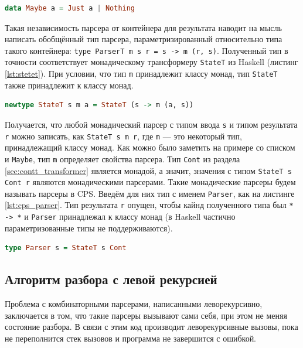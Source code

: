 \documentclass[times]{itmo-student-thesis}
\begin{document}
\begin{lstlisting}[language=Haskell,float=!h,caption={Тип Maybe в Haskell},label={lst:maybe}]
  data Maybe a = Just a | Nothing
\end{lstlisting}

Такая независимость парсера от контейнера для результата наводит на мысль написать обобщённый тип парсера,
параметризированный относительно типа такого контейнера: \lstinline {type ParserT m s r = s -> m (r, s)}. Полученный
тип в точности соответствует монадическому трансформеру \lstinline{StateT} из Haskell (листинг \ref{lst:stetet}). При условии, что	тип
\lstinline{m} принадлежит классу монад, тип \lstinline{StateT} также принадлежит к классу монад. 

\begin{lstlisting}[language=Haskell,float=!h,caption={StateT трансформер монад},label={lst:stetet}]
  newtype StateT s m a = StateT (s -> m (a, s))
\end{lstlisting}

Получается, что любой монадический парсер с типом ввода \lstinline{s} и типом результата \lstinline{r} можно
записать, как \lstinline{StateT s m r}, где \lstinline{m} --- это некоторый тип, принадлежащий классу монад. Как можно 
было заметить на примере со списком и \lstinline{Maybe}, тип \lstinline{m} определяет свойства парсера. 
Тип \lstinline{Cont} из раздела \ref{sec:contt_transformer} является монадой, а значит, значения с типом
\lstinline{StateT s Cont r} являются монадическими парсерами. Такие монадические парсеры будем называть парсеры
в CPS. Введём для них тип с именем \lstinline{Parser}, как на листинге \ref{lst:cps_parser}. Тип результата
\lstinline{r} опущен, чтобы кайнд полученного типа был \lstinline{* -> *} и \lstinline{Parser} принадлежал к
классу монад (в Haskell частично параметризованные типы не поддерживаются).

\begin{lstlisting}[language=Haskell,float=!h,caption={Парсер в CPS},label={lst:cps_parser}]
  type Parser s = StateT s Cont
\end{lstlisting}

\subsection{Алгоритм разбора с левой рекурсией}\label{sec:memoized_cps_parser}

Проблема с комбинаторными парсерами, написанными леворекурсивно, заключается в том, что такие парсеры вызывают сами
себя, при этом не меняя состояние разбора. В связи с этим код производит леворекурсивные вызовы, пока не переполнится стек 
вызовов и программа не завершится с ошибкой.
\end{document}
